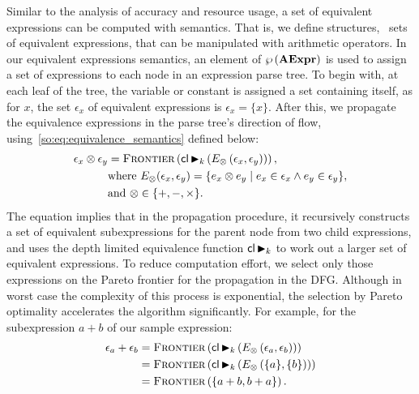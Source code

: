 Similar to the analysis of accuracy and resource usage, a set of equivalent
expressions can be computed with semantics. That is, we define structures,
\ie~sets of equivalent expressions, that can be manipulated with arithmetic
operators. In our equivalent expressions semantics, an element of
$\wp\left({\mathbf{AExpr}}\right)$ is used to assign a set of expressions to each node
in an expression parse tree. To begin with, at each leaf of the tree, the
variable or constant is assigned a set containing itself, as for $x$, the set
$\epsilon_x$ of equivalent expressions is $\epsilon_x = \{x\}$. After this, we
propagate the equivalence expressions in the parse tree's direction of flow,
using~\eqref{so:eq:equivalence_semantics} defined below:
\begin{equation}
    \begin{aligned}
        \epsilon_x \otimes \epsilon_y &= \operatorname{\textsc{Frontier}}\left(
            \mathsf{cl} \operatorname{\blacktriangleright}_k \left(
                E_\otimes \left( \epsilon_x, \epsilon_y \right)
            \right) \right), \\
        & \text{where~}
        E_\otimes(\epsilon_x, \epsilon_y) = \{
            e_x \otimes e_y \mid e_x \in \epsilon_x \wedge e_y \in \epsilon_y
        \}, \\
        & \text{and~} \otimes\in\{+, -, \times\}.
    \end{aligned}
    \label{so:eq:equivalence_semantics}
\end{equation}
The equation implies that in the propagation procedure, it recursively
constructs a set of equivalent subexpressions for the parent node from two
child expressions, and uses the depth limited equivalence function $\mathsf{cl}
\operatorname{\blacktriangleright}_k$ to work out a larger set of equivalent expressions. To reduce
computation effort, we select only those expressions on the Pareto frontier
for the propagation in the DFG\@. Although in worst case the complexity of
this process is exponential, the selection by Pareto optimality accelerates
the algorithm significantly. For example, for the subexpression $a + b$ of our
sample expression:
\begin{equation}
    \begin{aligned}
        \epsilon_a + \epsilon_b
            &= \operatorname{\textsc{Frontier}}\left(
                    \mathsf{cl} \operatorname{\blacktriangleright}_k \left(
                        E_\otimes \left( \epsilon_a, \epsilon_b \right)
                    \right)
                \right) \\
            &= \operatorname{\textsc{Frontier}}\left(
                    \mathsf{cl} \operatorname{\blacktriangleright}_k \left(
                        E_\otimes \left( \{a\}, \{b\} \right)
                    \right)
                \right) \\
            &= \operatorname{\textsc{Frontier}}\left(
                    \{ a + b, b + a \}
                \right).
    \end{aligned}
\end{equation}
